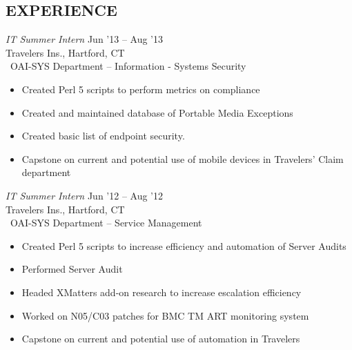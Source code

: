 \documentclass[margin]{res}
\begin{document}
\begin{resume}
\section{EXPERIENCE} {\sl IT Summer Intern} \hfill Jun '13 -- Aug '13 \\
                     Travelers Ins., Hartford, CT\\\
                     OAI-SYS Department -- Information - Systems Security
                     \begin{itemize}  \itemsep -2pt %
                         \item Created Perl 5 scripts to perform metrics on 
                         compliance
                         \item Created and maintained database of Portable 
                         Media Exceptions
                         \item Created basic list of endpoint security.
                         \item Capstone on current and potential use of mobile 
                         devices in Travelers' Claim department
                     \end{itemize}

                     {\sl IT Summer Intern} \hfill Jun '12 -- Aug '12 \\
                     Travelers Ins., Hartford, CT\\\
                     OAI-SYS Department -- Service Management
                     \begin{itemize}  \itemsep -2pt %
                         \item Created Perl 5 scripts to increase efficiency and
                               automation of Server Audits
                         \item Performed Server Audit
                         \item Headed XMatters add-on research to increase escalation
                               efficiency
                         \item Worked on N05/C03 patches for BMC TM ART monitoring
                               system
                         \item Capstone on current and potential use of 
                               automation in Travelers
                     \end{itemize}
      

\end{resume}
\end{document}
